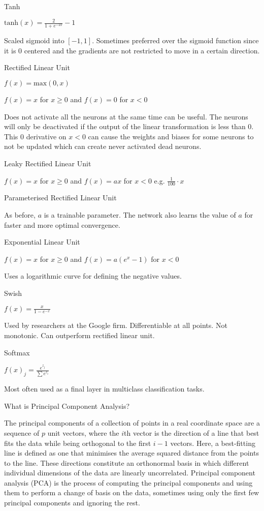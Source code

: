 Tanh

$\text{tanh}(x) = \frac{2}{1+e^{-2x}} - 1$

Scaled sigmoid into $[-1,1]$. Sometimes preferred over the sigmoid function since it is $0$ centered and the gradients are not restricted to move in a certain direction.

Rectified Linear Unit

$f(x) = \text{max}(0,x)$

$f(x) = x$ for $x \ge 0$ and $f(x) = 0$ for $x<0$

Does not activate all the neurons at the same time can be useful. The neurons will only be deactivated if the output of the linear transformation is less than $0$. This $0$ derivative on $x<0$ can cause the weights and biases for some neurons to not be updated which can create never activated dead neurons.

Leaky Rectified Linear Unit

$f(x) = x$ for $x \ge 0$ and $f(x) = ax$ for $x<0$ e.g. $\frac{1}{100} \cdot x$

Parameterised Rectified Linear Unit

As before, $a$ is a trainable parameter. The network also learns the value of $a$ for faster and more optimal convergence.

Exponential Linear Unit

$f(x) = x$ for $x \ge 0$ and $f(x) = a \left( e^x-1 \right)$ for $x<0$

Uses a logarithmic curve for defining the negative values.

Swish

$f(x) = \frac{x}{1-e^{-x}}$

Used by researchers at the Google firm. Differentiable at all points. Not monotonic. Can outperform rectified linear unit.

Softmax

$f(x)_j = \frac{e^{z_j}}{\sum e^{z_i}}$

Most often used as a final layer in multiclass classification tasks.

What is Principal Component Analysis?

The principal components of a collection of points in a real coordinate space are a sequence of $p$ unit vectors, where the $i$th vector is the direction of a line that best fits the data while being orthogonal to the first $i-1$ vectors. Here, a best-fitting line is defined as one that minimises the average squared distance from the points to the line. These directions constitute an orthonormal basis in which different individual dimensions of the data are linearly uncorrelated. Principal component analysis (PCA) is the process of computing the principal components and using them to perform a change of basis on the data, sometimes using only the first few principal components and ignoring the rest.

